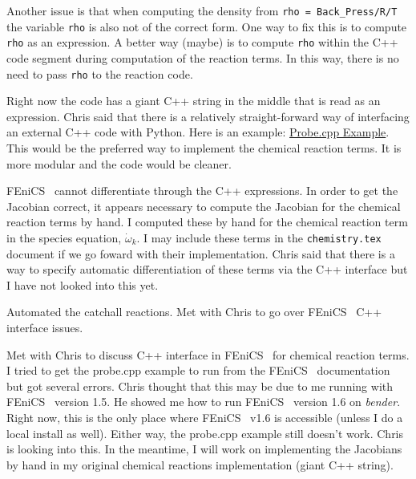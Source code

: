 \documentclass[fontsize=11pt, %
               paper=a4, %
               oneside, %
               captions=tableheading,
               index=totoc,
               hyperref]{labbook}
\newcommand{\fenics}{FEniCS \ }
\begin{document}
Another issue is that when computing the density from \texttt{rho = Back\_Press/R/T} the variable \texttt{rho} is also not of the correct form.  One way to fix this is to compute \texttt{rho} as an expression.  A better way (maybe) is to compute \texttt{rho} within the C++ code segment during computation of the reaction terms.  In this way, there is no need to pass \texttt{rho} to the reaction code.


Right now the code has a giant C++ string in the middle that is read as an expression.  Chris said that there is a relatively straight-forward way of interfacing an external C++ code with Python.  Here is an example:  \href{http://hplgit.github.io/fenics-mixed/doc/pub/sphinx-cbc/.\_part0003\_fenics-mixed.html}{Probe.cpp Example}.  This would be the preferred way to implement the chemical reaction terms.  It is more modular and the code would be cleaner.


\fenics cannot differentiate through the C++ expressions.  In order to get the Jacobian correct, it appears necessary to compute the Jacobian for the chemical reaction terms by hand.  I computed these by hand for the chemical reaction term in the species equation, $\dot\omega_{k}$.  I may include these terms in the \texttt{chemistry.tex} document if we go foward with their implementation.  Chris said that there is a way to specify automatic differentiation of these terms via the C++ interface but I have not looked into this yet.


Automated the catchall reactions.  Met with Chris to go over \fenics C++ interface issues.


Met with Chris to discuss C++ interface in \fenics for chemical reaction terms.  I tried to get the probe.cpp example to run from the \fenics documentation but got several errors.  Chris thought that this may be due to me running with \fenics version 1.5.  He showed me how to run \fenics version 1.6 on \textit{bender}.  Right now, this is the only place where \fenics v1.6 is accessible (unless I do a local install as well).  Either way, the probe.cpp example still doesn't work.  Chris is looking into this.  In the meantime, I will work on implementing the Jacobians by hand in my original chemical reactions implementation (giant C++ string).
\end{document}
